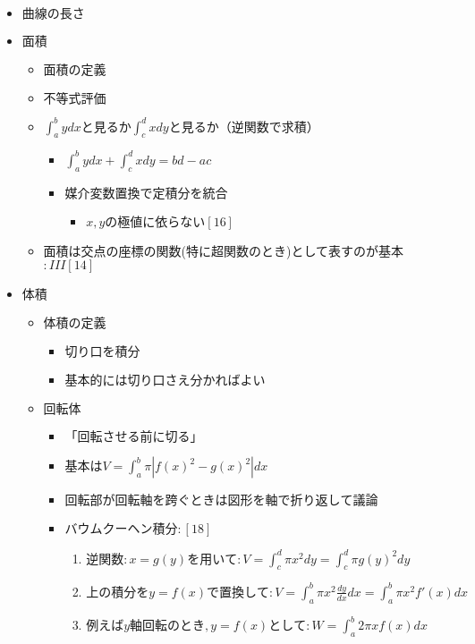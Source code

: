 \documentclass[dvipdfmx,uplatex]{jsarticle}
\begin{document}
\begin{itemize}
\begin{itemize}
\begin{itemize}
\begin{itemize}
\begin{enumerate}
				\end{enumerate}
			\end{itemize}
		\end{itemize}
	\end{itemize}
	\item $ 曲線の長さ$
	\item $ 面積$
	\begin{itemize}
		\item $ 面積の定義$
		\item $ 不等式評価$
		\item $ \int^b_a ydx と見るか \int^d_c xdy と見るか（逆関数で求積）$
		\begin{itemize}
			\item $ \int^b_a ydx + \int^d_c xdy = bd - ac$
			\item $ 媒介変数置換で定積分を統合$
			\begin{itemize}
				\item $ x,yの極値に依らない [16]$
			\end{itemize}
		\end{itemize}
		\item 面積は交点の座標の関数(特に超関数のとき)として表すのが基本$:III[14]$
	\end{itemize}
	\item $ 体積$
	\begin{itemize}
		\item $ 体積の定義$
		\begin{itemize}
			\item $ 切り口を積分$
			\item $ 基本的には切り口さえ分かればよい$
		\end{itemize}
		\item $ 回転体$
		\begin{itemize}
			\item $ 「回転させる前に切る」$
			\item $ 基本はV = \int^b_a \pi |f(x)^2 - g(x)^2|dx$
			\item $ 回転部が回転軸を跨ぐときは図形を軸で折り返して議論$
			\item $ バウムクーヘン積分:[18] $
			\begin{enumerate}
				\item $ 逆関数:x=g(y)を用いて:V= \int^d_c \pi x^2 dy = \int^d_c \pi g(y)^2 dy$
				\item $ 上の積分をy=f(x)で置換して:V= \int^b_a \pi x^2 \frac{dy}{dx} dx = \int^b_a \pi x^2 f'(x)dx$
				\item $ 例えばy軸回転のとき,y = f(x)として:W = \int^b_a 2\pi xf(x)dx$

\end{enumerate}
\end{itemize}
\end{itemize}
\end{itemize}
\end{document}

